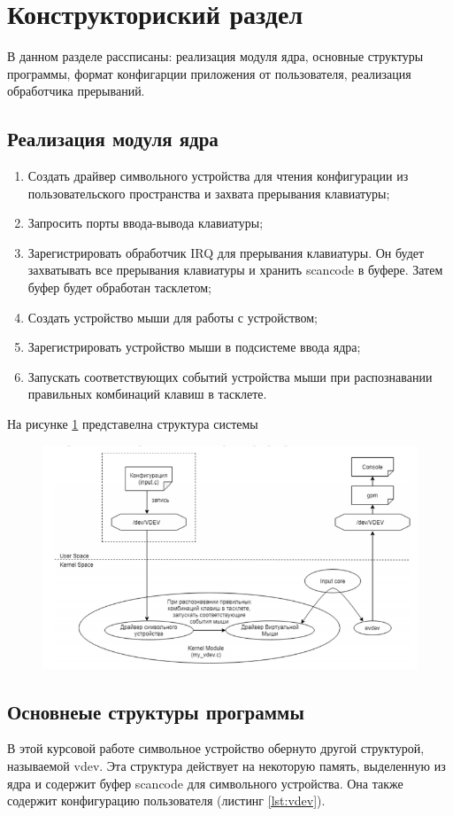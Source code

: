 \newpage
\section{Конструкториский раздел}
В данном разделе рассписаны: реализация модуля ядра, основные структуры программы, формат конфигарции приложения от пользователя, реализация обработчика прерываний.
\subsection{Реализация модуля ядра}
\begin{enumerate}
	\item Создать драйвер символьного устройства для чтения конфигурации из пользовательского пространства и захвата прерывания клавиатуры;
	\item Запросить порты ввода-вывода клавиатуры;
	\item Зарегистрировать обработчик IRQ для прерывания клавиатуры. Он будет захватывать все прерывания клавиатуры и хранить scancode в буфере.
	Затем буфер будет обработан тасклетом;
	\item Создать устройство мыши для работы с устройством;
	\item Зарегистрировать устройство мыши в подсистеме ввода ядра;
	\item Запускать соответствующих событий устройства мыши при распознавании правильных комбинаций клавиш в тасклете. 
\end{enumerate}

На рисунке \ref{fig:moduleschema} представелна структура системы
\begin{figure}[H]
	\centering
	\includegraphics[width=0.7\linewidth]{src/img/module_schema}
	\caption{}
	\label{fig:moduleschema}
\end{figure}

\subsection{Основнеые структуры программы}
В этой курсовой работе символьное устройство обернуто другой структурой, называемой vdev. 
Эта структура действует на некоторую память, выделенную из ядра и содержит буфер scancode для символьного устройства. 
Она также содержит конфигурацию пользователя (листинг \ref{lst:vdev}).


